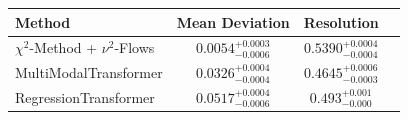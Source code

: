     \begin{tabular}{lccc}
        \toprule
        Method & Mean Deviation & Resolution \\
        \midrule
        $\chi^2$-Method + $\nu^2$-Flows & $0.0054_{-0.0006}^{+0.0003}$ & $0.5390_{-0.0004}^{+0.0004}$ \\
        MultiModalTransformer & $0.0326_{-0.0004}^{+0.0004}$ & $0.4645_{-0.0003}^{+0.0006}$ \\
        RegressionTransformer & $0.0517_{-0.0006}^{+0.0004}$ & $0.493_{-0.000}^{+0.001}$ \\
        \bottomrule
    \end{tabular}